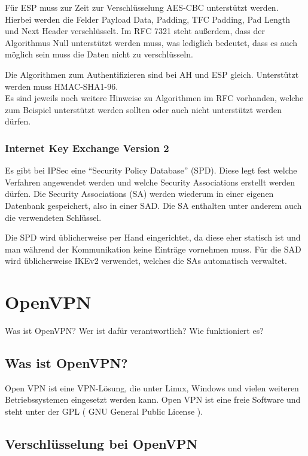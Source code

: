 \documentclass[12pt]{scrartcl}
\begin{document}
Für ESP muss zur Zeit zur Verschlüsselung AES-CBC unterstützt werden. Hierbei werden die Felder Payload Data, Padding, TFC Padding, Pad Length und Next Header verschlüsselt. Im RFC 7321 steht außerdem, dass der Algorithmus Null unterstützt werden muss, was lediglich bedeutet, dass es auch möglich sein muss die Daten nicht zu verschlüsseln.

Die Algorithmen zum Authentifizieren sind bei AH und ESP gleich. Unterstützt werden muss HMAC-SHA1-96.\\
Es sind jeweils noch weitere Hinweise zu Algorithmen im RFC vorhanden, welche zum Beispiel unterstützt werden sollten oder auch nicht unterstützt werden dürfen. 
\subsubsection{Internet Key Exchange Version 2}
Es gibt bei IPSec eine "`Security Policy Database"' (SPD). Diese legt fest welche Verfahren angewendet werden und welche Security Associations erstellt werden dürfen. Die Security Associations (SA) werden wiederum in einer eigenen Datenbank gespeichert, also in einer SAD. Die SA enthalten unter anderem auch die verwendeten Schlüssel.

Die SPD wird üblicherweise per Hand eingerichtet, da diese eher statisch ist und man während der Kommunikation keine Einträge vornehmen muss. Für die SAD wird üblicherweise IKEv2 verwendet, welches die SAs automatisch verwaltet.

\section{OpenVPN}
%
Was ist OpenVPN? Wer ist dafür verantwortlich? Wie funktioniert es?


\subsection{Was ist OpenVPN?}

Open VPN ist eine VPN-Lösung, die unter Linux, Windows und vielen weiteren Betriebssystemen eingesetzt werden kann.
Open VPN ist eine freie Software und steht unter der GPL ( GNU General Public License ).

\subsection{Verschlüsselung bei OpenVPN}
\end{document}
